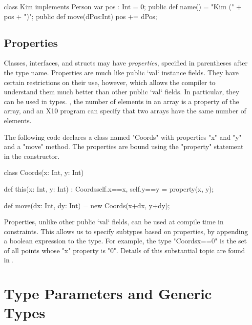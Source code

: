 \begin{xten}
class Kim implements Person {
   var pos : Int = 0;
   public def name() = "Kim (" + pos + ")";
   public def move(dPos:Int) { pos += dPos; }
}
\end{xten}
%


\subsection{Properties}
\label{properties}

Classes, interfaces, and structs may have {\em properties}, specified in
parentheses after the type name. Properties are much like public \xcd`val`
instance fields. They have certain restrictions on their use, however, which
allows the compiler to understand them much better than other public \xcd`val`
fields. In particular, they can be used in types.  \Eg, the number of elements
in an array is a property of the array, and an X10 program can specify that
two arrays have the same number of elements.

\begin{ex}
The
following code declares a class named \xcd"Coords" with properties
\xcd"x" and \xcd"y" and a \xcd"move" method. The properties are bound
using the \xcd"property" statement in the constructor.

\begin{xten}
class Coords(x: Int, y: Int) { 
  def this(x: Int, y: Int) :
    Coords{self.x==x, self.y==y} = { 
    property(x, y); 
  } 

  def move(dx: Int, dy: Int) = new Coords(x+dx, y+dy); 
}
\end{xten}
\end{ex}
Properties, unlike other public \xcd`val` fields, can be used  
at compile time in {constraints}. This allows us
to specify subtypes based on properties, by appending a boolean expression to
the type. For example, the type \xcd"Coords{x==0}" is the set of all points
whose \xcd"x" property is \xcd"0".  Details of this substantial topic are
found in .



\section{Type Parameters and Generic Types}
\label{TypeParameters}

